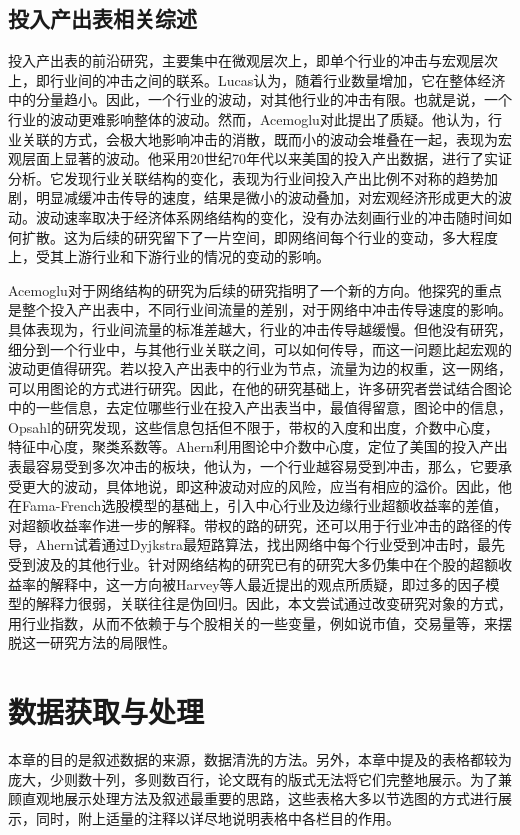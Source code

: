 \documentclass{sysuthesis}
\begin{document}
\section{投入产出表相关综述}

投入产出表的前沿研究，主要集中在微观层次上，即单个行业的冲击与宏观层次上，即行业间的冲击之间的联系。Lucas\cite{lucas_understanding_1977}认为，随着行业数量增加，它在整体经济中的分量趋小。因此，一个行业的波动，对其他行业的冲击有限。也就是说，一个行业的波动更难影响整体的波动。然而，Acemoglu\cite{acemoglu_network_2012}对此提出了质疑。他认为，行业关联的方式，会极大地影响冲击的消散，既而小的波动会堆叠在一起，表现为宏观层面上显著的波动。他采用20世纪70年代以来美国的投入产出数据，进行了实证分析。它发现行业关联结构的变化，表现为行业间投入产出比例不对称的趋势加剧，明显减缓冲击传导的速度，结果是微小的波动叠加，对宏观经济形成更大的波动。波动速率取决于经济体系网络结构的变化，没有办法刻画行业的冲击随时间如何扩散。这为后续的研究留下了一片空间，即网络间每个行业的变动，多大程度上，受其上游行业和下游行业的情况的变动的影响。

Acemoglu\cite{acemoglu_microeconomic_2015}对于网络结构的研究为后续的研究指明了一个新的方向。他探究的重点是整个投入产出表中，不同行业间流量的差别，对于网络中冲击传导速度的影响。具体表现为，行业间流量的标准差越大，行业的冲击传导越缓慢。但他没有研究，细分到一个行业中，与其他行业关联之间，可以如何传导，而这一问题比起宏观的波动更值得研究。若以投入产出表中的行业为节点，流量为边的权重，这一网络，可以用图论的方式进行研究。因此，在他的研究基础上，许多研究者尝试结合图论中的一些信息，去定位哪些行业在投入产出表当中，最值得留意，图论中的信息，Opsahl\cite{opsahl_node_2010}的研究发现，这些信息包括但不限于，带权的入度和出度，介数中心度，特征中心度，聚类系数等。Ahern\cite{ahern2013network}利用图论中介数中心度，定位了美国的投入产出表最容易受到多次冲击的板块，他认为，一个行业越容易受到冲击，那么，它要承受更大的波动，具体地说，即这种波动对应的风险，应当有相应的溢价。因此，他在Fama-French\cite{fama_multifactor_1996}选股模型的基础上，引入中心行业及边缘行业超额收益率的差值，对超额收益率作进一步的解释。带权的路的研究，还可以用于行业冲击的路径的传导，Ahern\cite{ahern_importance_2014}试着通过Dyjkstra最短路算法，找出网络中每个行业受到冲击时，最先受到波及的其他行业。针对网络结构的研究已有的研究大多仍集中在个股的超额收益率的解释中，这一方向被Harvey等人最近提出的观点所质疑，即\cite{harvey__2016}过多的因子模型的解释力很弱，关联往往是伪回归。因此，本文尝试通过改变研究对象的方式，用行业指数，从而不依赖于与个股相关的一些变量，例如说市值，交易量等，来摆脱这一研究方法的局限性。

\chapter{数据获取与处理}
本章的目的是叙述数据的来源，数据清洗的方法。另外，本章中提及的表格都较为庞大，少则数十列，多则数百行，论文既有的版式无法将它们完整地展示。为了兼顾直观地展示处理方法及叙述最重要的思路，这些表格大多以节选图的方式进行展示，同时，附上适量的注释以详尽地说明表格中各栏目的作用。
\end{document}
